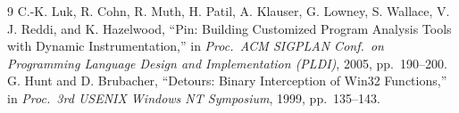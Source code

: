 \documentclass[10pt,twocolumn,a4paper]{article}
\begin{document}
\begin{thebibliography}{9}
 C.-K. Luk, R. Cohn, R. Muth, H. Patil, A. Klauser, G. Lowney,
  S. Wallace, V. J. Reddi, and K. Hazelwood, ``Pin: Building Customized Program
  Analysis Tools with Dynamic Instrumentation,'' in \emph{Proc.\ ACM SIGPLAN
  Conf.\ on Programming Language Design and Implementation (PLDI)}, 2005,
  pp.\ 190--200.
 G. Hunt and D. Brubacher, ``Detours: Binary Interception of
  Win32 Functions,'' in \emph{Proc.\ 3rd USENIX Windows NT Symposium}, 1999,
  pp.\ 135--143.
\end{thebibliography}
\end{document}
